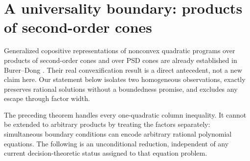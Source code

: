 \section{A universality boundary: products of second-order cones}
Generalized copositive representations of nonconvex quadratic programs over products of second-order cones and over PSD cones are already established in Burer--Dong \cite{BD}. Their real convexification result is a direct antecedent, not a new claim here. Our statement below isolates two homogeneous observations, exactly preserves rational solutions without a boundedness promise, and excludes any escape through factor width.

The preceding theorem handles every one-quadratic column inequality. It cannot be extended to arbitrary products by treating the factors separately: simultaneous boundary conditions can encode arbitrary rational polynomial equations. The following is an unconditional reduction, independent of any current decision-theoretic status assigned to that equation problem.

